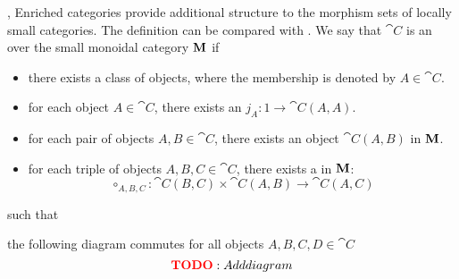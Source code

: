 \begin{definition}\label{def:enriched_category}\mcite\cite[180]{MacLane1994},\cite{nLab:enriched_category}
  Enriched categories provide additional structure to the morphism sets of locally small categories. The definition can be compared with . We say that \( \cat{C} \) is an  over the small monoidal category \( \operatorname{\mathbf{M}} \) if
  \begin{itemize}
    \item there exists a class of objects, where the membership is denoted by \( A \in \cat{C} \).
    \item for each object \( A \in \cat{C} \), there exists an  \( j_A: 1 \to \cat{C}(A, A) \).
    \item for each pair of objects \( A, B \in \cat{C} \), there exists an object \( \cat{C}(A, B) \) in \( \operatorname{\mathbf{M}} \).
    \item for each triple of objects \( A, B, C \in \cat{C} \), there exists a  in \( \operatorname{\mathbf{M}} \):
          \begin{equation*}
            \circ_{A,B,C}: {\cat{C}}(B, C) \times {\cat{C}}(A, B) \to {\cat{C}}(A, C)
          \end{equation*}
  \end{itemize}
  such that
  \begin{thmenum}
    \item the following diagram commutes for all objects \( A, B, C, D \in \cat{C} \)
    \begin{equation*}
      \todo{Add diagram}\iffalse\begin{mplibcode}
        u := 2cm;

        beginfig(1);
        input metapost/graphs;

        v1 := thelabel("$C(A, D)$", origin);
        v2 := thelabel("$C(C, D) \otimes C(A, C)$", (-2, -1) scaled u);
        v3 := thelabel("$C(C, D) \otimes (C(B, C) \otimes C(A, B))$", (-2, -2) scaled u);
        v4 := thelabel("$C(B, D) \otimes C(A, B)$", (2, -1) scaled u);
        v5 := thelabel("$(C(C, D) \otimes C(B, C)) \otimes C(A, B)$", (2, -2) scaled u);

        a1 := straight_arc(v2, v1);
        a2 := straight_arc(v4, v1);
        a3 := straight_arc(v2, v3);
        a4 := straight_arc(v5, v4);
        a5 := straight_arc(v3, v5);

        draw_vertices(v);
        draw_arcs(a);

        label.ulft("$\circ_{A, C, D}$", straight_arc_midpoint of a1);
        label.urt("$\circ_{A, B, D}$", straight_arc_midpoint of a2);
        label.lft("$\id \otimes \circ_{A, B, C}$", straight_arc_midpoint of a3);
        label.rt("$\circ_{B, C, D} \otimes \id$", straight_arc_midpoint of a4);
        label.bot("$\sigma$", straight_arc_midpoint of a5);
        endfig;
      \end{mplibcode}\fi
    \end{equation*}


\end{thmenum}
\end{definition}
